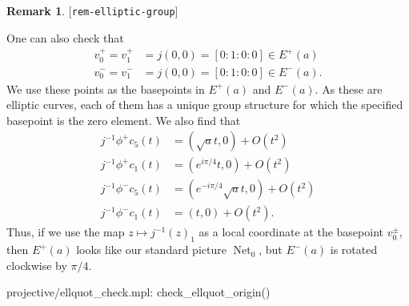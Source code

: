 \documentclass[reqno]{amsart}
\newcommand{\lbl}[1]{\label{#1}\textup{[\texttt{#1}]}\par}
\newcommand{\lbl}{\label}
\newcommand{\Net}	{\operatorname{Net}}
\renewcommand{\:}{\colon}
\theoremstyle{definition}
\newtheorem{remark}[theorem]{Remark}
\begin{document}
\begin{remark}\lbl{rem-elliptic-group}
 One can also check that
 \begin{align*}
  v^+_0 = v^+_1 &= j(0,0) = [0:1:0:0] \in E^+(a) \\
  v^-_0 = v^-_1 &= j(0,0) = [0:1:0:0] \in E^-(a).
 \end{align*}
 We use these points as the basepoints in $E^+(a)$ and $E^-(a)$.  As
 these are elliptic curves, each of them has a unique group structure
 for which the specified basepoint is the zero element.  We also find
 that
 \begin{align*}
  j^{-1}\phi^+c_5(t) &= (\sqrt{a}t,0) + O(t^2) \\
  j^{-1}\phi^+c_1(t) &= (e^{i\pi/4}t,0) + O(t^2) \\
  j^{-1}\phi^-c_5(t) &= (e^{-i\pi/4}\sqrt{a}t,0) + O(t^2) \\
  j^{-1}\phi^-c_1(t) &= (t,0) + O(t^2).
 \end{align*}
 Thus, if we use the map $z\mapsto j^{-1}(z)_1$ as a local coordinate
 at the basepoint $v^\pm_0$, then $E^+(a)$ looks like our
 standard picture $\Net_0$, but $E^-(a)$ is rotated clockwise by
 $\pi/4$.
 \begin{checks}
  projective/ellquot_check.mpl: check_ellquot_origin()
 \end{checks}
\end{remark}
\end{document}
